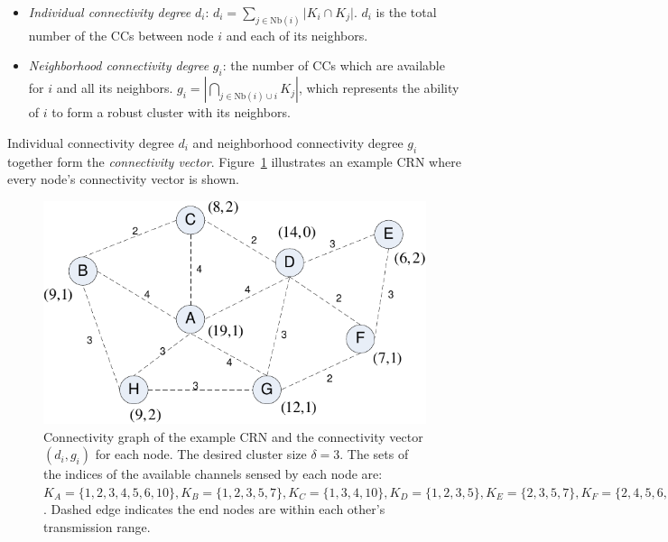 \documentclass[10pt,journal,compsoc]{IEEEtran}
\theoremstyle{mytheoremstyle}
\theoremstyle{mytheoremstyle}
\theoremstyle{mytheoremstyle}
\begin{document}




\begin{itemize}

\item \textit{Individual connectivity degree} $d_i$: $d_i=\sum_{j\in \text{Nb}(i)}\vert K_i\cap K_j\vert$. 
$d_i$ is the total number of the CCs between node $i$ and each of its neighbors.

\item \textit{Neighborhood connectivity degree} $g_i$: the number of CCs which are available for $i$ and all its neighbors.
$g_i=|\bigcap_{j\in \text{Nb}(i)\cup i}K_j|$, which represents the ability of $i$ to form a robust cluster with its neighbors.
\end{itemize}
Individual connectivity degree $d_i$ and neighborhood connectivity degree $g_i$ together form the \textit{connectivity vector}.
Figure~\ref{fig1} illustrates an example CRN where every node's connectivity vector is shown.	
\begin{figure}[ht!]
  \centering
\includegraphics[width=0.7\linewidth]{figure1.pdf}
	\caption{Connectivity graph of the example CRN and the connectivity vector $(d_i, g_i)$ for each node. The desired cluster size $\delta =3$. The sets of the indices of the available channels sensed by each node are: $K_A=\{1,2,3,4,5,6,10\}, K_B=\{1,2,3,5,7\}, K_C=\{1,3,4,10\}, K_D=\{1,2,3,5\}, K_E=\{2,3,5,7\}, K_F=\{2,4,5,6,7\}, K_G=\{1,2,3,4,8\}, K_H=\{1,2,5,8\}$. Dashed edge indicates the end nodes are within each other's transmission range.}
	\label{fig1}
\end{figure}

	
\end{document}
